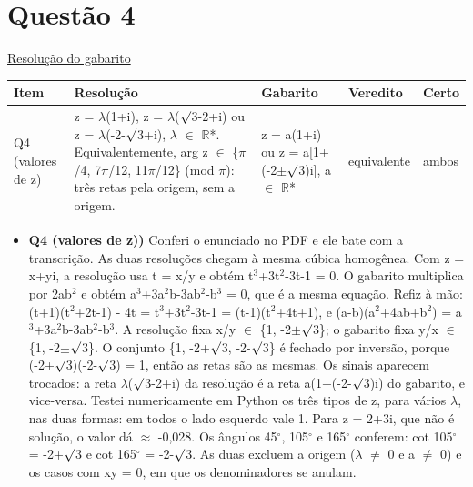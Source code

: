 \documentclass{article}%
\begin{document}
\section*{Questão 4}%
\href{https://poliedroresolve.sistemapoliedro.com.br/vestibulares/ime/2026/ime-2-fase-dia-1-23-10-2025-2-fase-dia-1/dissertativa-4-matematica-2-fase-dia-1-ime-2026}{Resolução do gabarito}\par\smallskip%
\begin{longtable}{@{}p{} p{} p{} p{} p{}@{}}\toprule Item & Resolução & Gabarito & Veredito & Certo \\ \midrule
Q4 (valores de z) & z = $\lambda$(1+i), z = $\lambda$($\surd$3-2+i) ou z = $\lambda$(-2-$\surd$3+i), $\lambda$ $\in$ $\mathbb{R}$*. Equivalentemente, arg z $\in$ \{$\pi$/4, 7$\pi$/12, 11$\pi$/12\} (mod $\pi$): três retas pela origem, sem a origem. & z = a(1+i) ou z = a{[}1+(-2$\pm$$\surd$3)i{]}, a $\in$ $\mathbb{R}$* & equivalente & ambos \\
\bottomrule\end{longtable}%
\begin{itemize}%
\item%
\textbf{Q4 (valores de z))} Conferi o enunciado no PDF e ele bate com a transcrição. As duas resoluções chegam à mesma cúbica homogênea. Com z = x+yi, a resolução usa t = x/y e obtém t$^3$+3t$^2$-3t-1 = 0. O gabarito multiplica por 2ab$^2$ e obtém a$^3$+3a$^2$b-3ab$^2$-b$^3$ = 0, que é a mesma equação. Refiz à mão: (t+1)(t$^2$+2t-1) - 4t = t$^3$+3t$^2$-3t-1 = (t-1)(t$^2$+4t+1), e (a-b)(a$^2$+4ab+b$^2$) = a$^3$+3a$^2$b-3ab$^2$-b$^3$. A resolução fixa x/y $\in$ \{1, -2$\pm$$\surd$3\}; o gabarito fixa y/x $\in$ \{1, -2$\pm$$\surd$3\}. O conjunto \{1, -2+$\surd$3, -2-$\surd$3\} é fechado por inversão, porque (-2+$\surd$3)(-2-$\surd$3) = 1, então as retas são as mesmas. Os sinais aparecem trocados: a reta $\lambda$($\surd$3-2+i) da resolução é a reta a(1+(-2-$\surd$3)i) do gabarito, e vice{-}versa. Testei numericamente em Python os três tipos de z, para vários $\lambda$, nas duas formas: em todos o lado esquerdo vale 1. Para z = 2+3i, que não é solução, o valor dá $\approx$ -0,028. Os ângulos 45$^\circ$, 105$^\circ$ e 165$^\circ$ conferem: cot 105$^\circ$ = -2+$\surd$3 e cot 165$^\circ$ = -2-$\surd$3. As duas excluem a origem ($\lambda$ $\neq$ 0 e a $\neq$ 0) e os casos com xy = 0, em que os denominadores se anulam.%
\end{itemize}%
\end{document}
